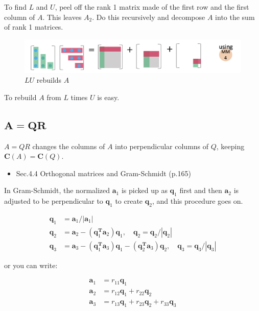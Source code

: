 \documentclass[letterpaper]{article}
\begin{document}
To find $L$ and $U$, peel off the rank 1 matrix made of
the first row and the first column of $A$.
This leaves $A_2$. Do this recursively and decompose $A$ into the sum of rank 1 matrices.


\begin{figure}[H]
  \includegraphics[keepaspectratio, width=\linewidth]{LU2.png}
\caption{$LU$ rebuilds $A$}
\end{figure}

To rebuild $A$ from $L$ times $U$ is easy.

\clearpage

\subsection{$\boldsymbol{A=QR}$}

$A=QR$ changes the columns of $A$ into perpendicular columns of $Q$, keeping $\bm{C}(A) = \bm{C}(Q)$.

\begin{itemize}
  \item Sec.4.4 Orthogonal matrices and Gram-Schmidt (p.165)
\end{itemize}

In Gram-Schmidt, the normalized $\bm{a}_1$ is picked up as $\bm{q}_1$ first and then
$\bm{a}_2$ is adjusted to be perpendicular to $\bm{q}_1$ to create $\bm{q}_2$, and this
procedure goes on.

\begin{align*}
  \bm{q}_1 &= \bm{a}_1/|\bm{a}_1| \\
  \bm{q}_2 &= \bm{a}_2 - (\bm{q}_1^\mathbf{T} \bm{a}_2)\bm{q}_1 , \quad \bm{q}_2 = \bm{q}_2/|\bm{q}_2| \\
  \bm{q}_3 &= \bm{a}_3 - (\bm{q}_1^\mathbf{T} \bm{a}_3)\bm{q}_1 - (\bm{q}_2^\mathbf{T} \bm{a}_3)\bm{q}_2, \quad \bm{q}_3 = \bm{q}_3/|\bm{q}_3|
\end{align*}

or you can write:

\begin{align*}
  \bm{a}_1 &= r_{11}\bm{q}_1\\
  \bm{a}_2 &= r_{12}\bm{q}_1 + r_{22} \bm{q}_2\\
  \bm{a}_3 &= r_{13}\bm{q}_1 + r_{23} \bm{q}_2 + r_{33} \bm{q}_3
\end{align*}
\end{document}
